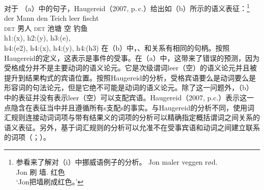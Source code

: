 \begin{exe}
\begin{xlist}[iv.]
\begin{exe}
\begin{xlist}[iv.]
对于 （a）中的句子，Haugereid（2007, p.\,c.）给出如（b）所示的语义表征：\footnote{%
  参看来了解对（i）中挪威语例子的分析。
\ea
\gll Jon maler veggen rød.\\
     Jon 刷 墙. 红色\\
\glt `Jon把墙刷成红色。'
\zlast
}
\eal
\ex 
\gll der Mann den Teich leer fischt\\
	 \textsc{det} 男人 \textsc{det} 池塘 空 钓鱼\\
\ex h1:(x), h2:(y), h3:(e),\\
    h4:(e2), h4:(x), h4:(y), h4:(h3)
\zl
在（b）中，、和关系有相同的句柄。按照Haugereid的定义，这表示是事件的受事。在（a）中，这带来了错误的预测，因为受格成分并不是主要动词的语义论元。它是次级谓词leer（空）的语义论元并且被提升到结果构式的宾语位置。按照Haugereid的分析，受格宾语要么是动词要么是形容词的句法论元，但是它绝不可能是动词的语义论元。除了这一问题外，（b）中的表征并没有表示leer（空）可以支配宾语。Haugereid（2007, p.c.）表示这一点隐含在表征当中并且遵循所有s支配s的事实。与Haugereid的分析不同，使用词汇规则连接动词词项与带有结果义的词项的分析可以精确指定概括谓词之间关系的语义表征。另外，基于词汇规则的分析可以允准不在受事宾语和动词之间建立联系的词项（\citealp{Wechsler97a,WN2001a}；\citealp[Chapter~5]{Mueller2002b}）。

\end{xlist}
\end{exe}
\end{xlist}
\end{exe}
